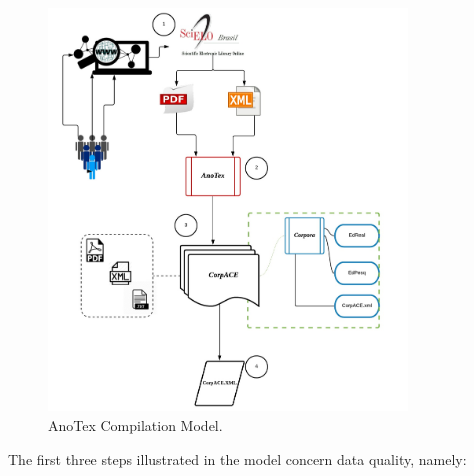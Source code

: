 \documentclass[english]{textolivre}
\begin{document}
\begin{figure}[htbp]
 \centering
 \includegraphics[width=0.85\textwidth]{Fig4.png}
 \caption{AnoTex Compilation Model.}
 \label{fig-04}
\end{figure}

The first three steps illustrated in the model concern data quality, namely:
\end{document}
